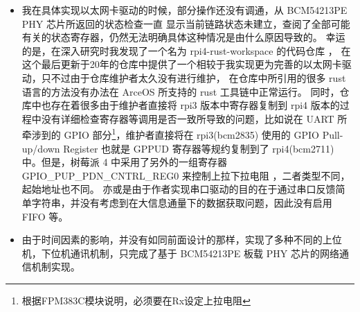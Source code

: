     \begin{itemize}
        \item 我在具体实现以太网卡驱动的时候，部分操作还没有调通，从 BCM54213PE PHY 芯片所返回的状态检查一直
        显示当前链路状态未建立，查阅了全部可能有关的状态寄存器，仍然无法明确具体这种情况是由什么原因导致的。
        幸运的是，在深入研究时我发现了一个名为 rpi4-rust-workspace 的代码仓库 \cite{rpi4-rust-workspace}，
        在这个最后更新于20年的仓库中提供了一个相较于我实现更为完善的以太网卡驱动，只不过由于仓库维护者太久没有进行维护，
        在仓库中所引用的很多 rust 语言的方法没有办法在 ArceOS 所支持的 rust 工具链中正常运行。
        同时，仓库中也存在着很多由于维护者直接将 rpi3 版本中寄存器复制到 rpi4 版本的过程中没有详细检查寄存器等调用是否一致所导致的问题，比如说在
        UART 所牵涉到的 GPIO 部分\footnote{根据FPM383C模块说明，必须要在Rx设定上拉电阻}，维护者直接将在
        rpi3(bcm2835) 使用的 GPIO Pull-up/down Register 也就是 GPPUD 寄存器等规约复制到了 rpi4(bcm2711)
        中。\cite{raspberry-pi-bcm2835}但是，树莓派 4 中采用了另外的一组寄存器 GPIO\_PUP\_PDN\_CNTRL\_REG0 来控制上拉下拉电阻
        \cite{raspberry-pi-bcm2711}，二者类型不同，起始地址也不同。
        亦或是由于作者实现串口驱动的目的在于通过串口反馈简单字符串，并没有考虑到在大信息通量下的数据获取问题，因此没有启用 FIFO 等。
        \item 由于时间因素的影响，并没有如同前面设计的那样，实现了多种不同的上位机，下位机通讯机制，只完成了基于 BCM54213PE 板载
        PHY 芯片的网络通信机制实现。
    \end{itemize}